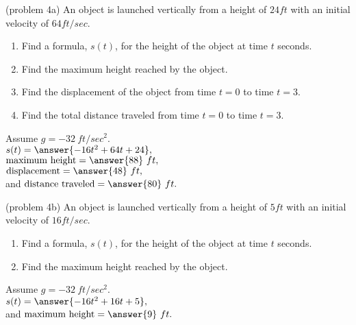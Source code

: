 \documentclass{ximera}
\begin{document}
\begin{problem}(problem 4a)
An object is launched vertically from a height of $24 ft$ with an initial velocity of $64 ft/sec$.  
\begin{enumerate}
\item Find a formula, $s(t)$, for the height of the object at time $t$
 seconds.
\item Find the maximum height reached by the object.
\item Find the displacement of the object from time $t = 0$ to time $t = 3$.
\item Find the total distance traveled from time $t = 0$ to time $t = 3$.
\end{enumerate}
Assume $g = -32 \ ft/sec^2$.\\
$s(t) = \answer{-16t^2 + 64t + 24},$\\
$\text{maximum height} =\answer{88} \ ft,$\\
$\text{displacement} =\answer{48} \ ft,$\\
and
$\text{distance traveled} = \answer{80} \ ft.$
\end{problem}



\begin{problem}(problem 4b)
An object is launched vertically from a height of $5 ft$ with an initial velocity of $16 ft/sec$.  
\begin{enumerate}
\item Find a formula, $s(t)$, for the height of the object at time $t$
 seconds.
\item Find the maximum height reached by the object.
\end{enumerate}
Assume $g = -32 \ ft/sec^2$.\\
$s(t) = \answer{-16t^2 + 16t + 5},$\\
and
$\text{maximum height} =\answer{9} \ ft.$\\


\end{problem}
\end{document}
